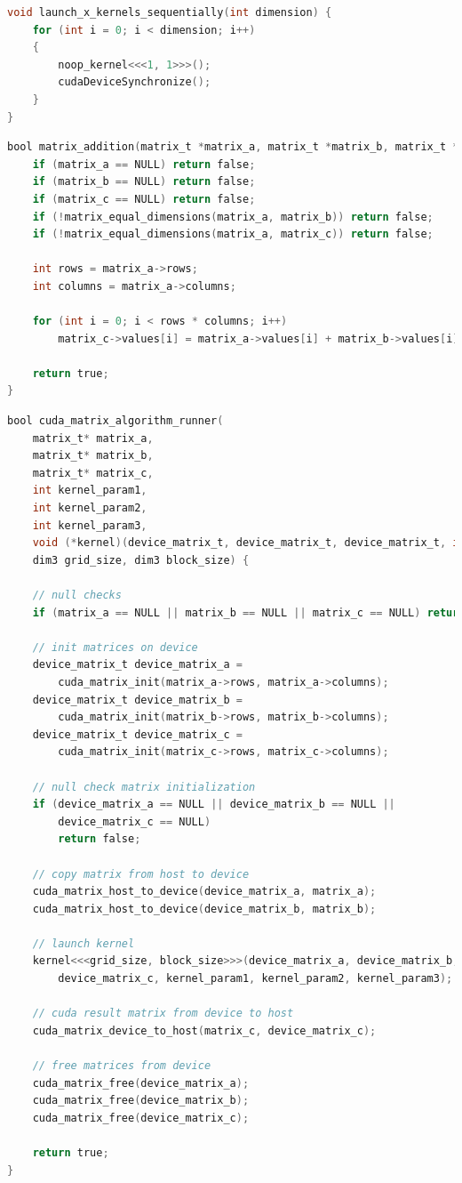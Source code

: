 \begin{lstlisting}[language=C, caption={Code to measure the launch of synchronous kernels}, label={lst:synchronous kernels}]
void launch_x_kernels_sequentially(int dimension) {
    for (int i = 0; i < dimension; i++)
    {
        noop_kernel<<<1, 1>>>();
        cudaDeviceSynchronize();
    }
}
\end{lstlisting}

\begin{lstlisting}[language=C, caption={CPU addition algorithm}, label={lst:cpu_addition}]
bool matrix_addition(matrix_t *matrix_a, matrix_t *matrix_b, matrix_t *matrix_c) {
    if (matrix_a == NULL) return false;
    if (matrix_b == NULL) return false;
    if (matrix_c == NULL) return false;
    if (!matrix_equal_dimensions(matrix_a, matrix_b)) return false;
    if (!matrix_equal_dimensions(matrix_a, matrix_c)) return false;

    int rows = matrix_a->rows;
    int columns = matrix_a->columns;

    for (int i = 0; i < rows * columns; i++)
        matrix_c->values[i] = matrix_a->values[i] + matrix_b->values[i];

    return true;
}
\end{lstlisting}

\begin{lstlisting}[language=C, caption={Algorithm runner for GPU algorithms.}, label={lst:algorithm_runner}]
bool cuda_matrix_algorithm_runner(
    matrix_t* matrix_a, 
    matrix_t* matrix_b,
    matrix_t* matrix_c, 
    int kernel_param1, 
    int kernel_param2, 
    int kernel_param3,
    void (*kernel)(device_matrix_t, device_matrix_t, device_matrix_t, int, int, int),
    dim3 grid_size, dim3 block_size) {
    
    // null checks
    if (matrix_a == NULL || matrix_b == NULL || matrix_c == NULL) return false;

    // init matrices on device
    device_matrix_t device_matrix_a =
        cuda_matrix_init(matrix_a->rows, matrix_a->columns);
    device_matrix_t device_matrix_b =
        cuda_matrix_init(matrix_b->rows, matrix_b->columns);
    device_matrix_t device_matrix_c =
        cuda_matrix_init(matrix_c->rows, matrix_c->columns);

    // null check matrix initialization
    if (device_matrix_a == NULL || device_matrix_b == NULL ||
        device_matrix_c == NULL)
        return false;

    // copy matrix from host to device
    cuda_matrix_host_to_device(device_matrix_a, matrix_a);
    cuda_matrix_host_to_device(device_matrix_b, matrix_b);

    // launch kernel
    kernel<<<grid_size, block_size>>>(device_matrix_a, device_matrix_b,
        device_matrix_c, kernel_param1, kernel_param2, kernel_param3);

    // cuda result matrix from device to host
    cuda_matrix_device_to_host(matrix_c, device_matrix_c);

    // free matrices from device
    cuda_matrix_free(device_matrix_a);
    cuda_matrix_free(device_matrix_b);
    cuda_matrix_free(device_matrix_c);

    return true;
}
\end{lstlisting}

